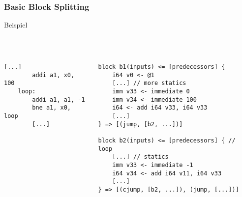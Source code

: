 
\begin{frame}[fragile]
    \frametitle{Basic Block Splitting}{Beispiel}
    ~\\
    ~\\
    ~\\
    \begin{columns}[c]
        \begin{lstlisting}[language=rv64]
        [...]
        addi a1, x0, 100
    loop:
        addi a1, a1, -1
        bne a1, x0, loop
        [...]
        \end{lstlisting}


        \begin{lstlisting}[language=SbtIr]
block b1(inputs) <= [predecessors] {
    i64 v0 <- @1
    [...] // more statics
    imm v33 <- immediate 0
    imm v34 <- immediate 100
    i64 <- add i64 v33, i64 v33
    [...]
} => [(jump, [b2, ...])]

block b2(inputs) <= [predecessors] { // loop
    [...] // statics
    imm v33 <- immediate -1
    i64 v34 <- add i64 v11, i64 v33
    [...]
} => [(cjump, [b2, ...]), (jump, [...])]
    \end{lstlisting}
    \end{columns}

\end{frame}
\clearpage

